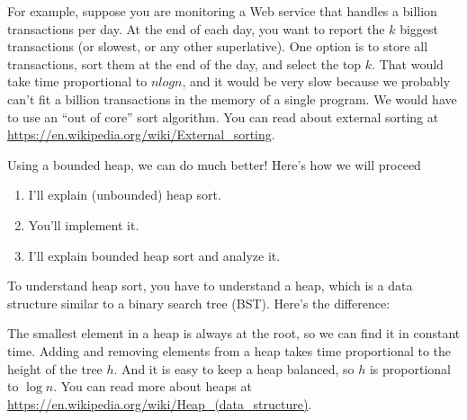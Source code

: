 \documentclass[12pt]{book}
\theoremstyle{exercise}
\newcommand{\java}{\verb}%}
\begin{document}
For example, suppose you are monitoring a Web service that handles a
billion transactions per day. At the end of each day, you want to report
the $k$ biggest transactions (or slowest, or any other
superlative). One option is to store all transactions, sort them at the
end of the day, and select the top $k$. That would take time
proportional to $n log n$, and it would be very slow because we
probably can't fit a billion transactions in the memory of a single
program. We would have to use an ``out of core'' sort algorithm. You can
read about external sorting at
\url{https://en.wikipedia.org/wiki/External_sorting}.

Using a bounded heap, we can do much better! Here's how we will
proceed

\begin{enumerate}

\item
  I'll explain (unbounded) heap sort.

\item
  You'll implement it.

\item
  I'll explain bounded heap sort and analyze it.

\end{enumerate}

To understand heap sort, you have to understand a heap, which is a data
structure similar to a binary search tree (BST). Here's the difference:



The smallest element in a heap is always at the root, so we can find it
in constant time. Adding and removing elements from a heap takes time
proportional to the height of the tree $h$. And it is easy to
keep a heap balanced, so $h$ is proportional to $\log n$.
You can read more about heaps at
\url{https://en.wikipedia.org/wiki/Heap_(data_structure)}.
\end{document}
